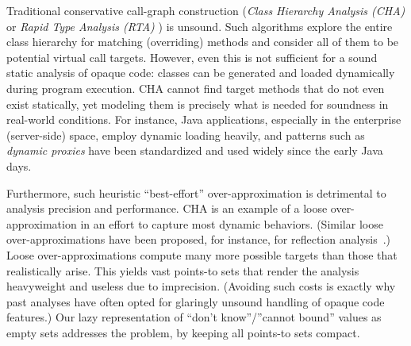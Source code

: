 Traditional conservative call-graph construction (\emph{Class Hierarchy Analysis (CHA)} \cite{ecoop:1995:Dean} or \emph{Rapid Type Analysis (RTA)} \cite{oopsla:1996:Bacon}) is unsound. Such algorithms explore the entire class hierarchy for matching (overriding) methods and consider all of them to be potential virtual call targets. However, even this is not sufficient for a sound static analysis of opaque code: classes can be generated and loaded dynamically during program execution. CHA cannot find target methods that do not even exist statically, yet modeling them is precisely what is needed for soundness in real-world conditions. For instance, Java applications, especially in the enterprise (server-side) space, employ dynamic loading heavily, and patterns such as \emph{dynamic proxies} have been standardized and used widely since the early Java days.

Furthermore, such heuristic ``best-effort'' over-approximation is detrimental to analysis precision and performance. CHA is an example of a loose over-approximation in an effort to capture most dynamic behaviors.
(Similar loose over-approximations have been proposed, for instance, for reflection analysis~\cite{aplas:2015:Smaragdakis}.) Loose over-approximations compute many more possible targets than those that realistically arise. This yields vast points-to sets that render the analysis heavyweight and useless due to imprecision. (Avoiding such costs is exactly why past analyses have often opted for glaringly unsound handling of opaque code features.) Our lazy representation of ``don't know''/''cannot bound'' values as empty sets addresses the problem, by keeping all points-to sets compact.

